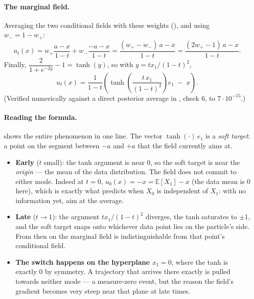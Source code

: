 \documentclass[11pt,a4paper]{report}
\theoremstyle{definition}
\theoremstyle{remark}
\newcommand{\EE}{\mathbb E}
\begin{document}
\paragraph{The marginal field.} Averaging the two conditional fields with
these weights (), and using
$w_-=1-w_+$:
\[
u_t(x)
= w_+\frac{a-x}{1-t} + w_-\frac{-a-x}{1-t}
= \frac{(w_+-w_-)\,a - x}{1-t}
= \frac{(2w_+-1)\,a - x}{1-t} .
\]
Finally, $\dfrac{2}{1+e^{-2y}}-1=\tanh(y)$, so with $y = tx_1/(1-t)^2$,
\begin{equation}
\label{eq:two-point-field}
\boxed{\;
u_t(x) = \frac{1}{1-t}\left(\tanh\!\left(\frac{t\,x_1}{(1-t)^2}\right)e_1 \;-\; x\right).
\;}
\end{equation}
(Verified numerically against a direct posterior average in
, check 6, to $7\cdot10^{-15}$.)

\paragraph{Reading the formula.}  shows the entire
phenomenon in one line. The vector $\tanh(\cdot)\,e_1$ is a \emph{soft
target}: a point on the segment between $-a$ and $+a$ that the field
currently aims at.

\begin{itemize}
\item \textbf{Early} ($t$ small): the tanh argument is near $0$, so the
      soft target is near the \emph{origin} --- the mean of the data
      distribution. The field does not commit to either mode. Indeed at
      $t=0$, $u_0(x) = -x = \EE[X_1]-x$ (the data mean is $0$ here), which
      is exactly what  predicts when
      $X_0$ is independent of $X_1$: with no information yet, aim at the
      average.
\item \textbf{Late} ($t\to1$): the argument $t x_1/(1-t)^2$ diverges, the
      tanh saturates to $\pm1$, and the soft target snaps onto whichever
      data point lies on the particle's side. From then on the marginal
      field is indistinguishable from that point's conditional field.
\item \textbf{The switch happens on the hyperplane $x_1=0$}, where the tanh
      is exactly $0$ by symmetry. A trajectory that arrives there exactly
      is pulled towards neither mode --- a measure-zero event, but the
      reason the field's gradient becomes very steep near that plane at
      late times.
\end{itemize}
\end{document}
